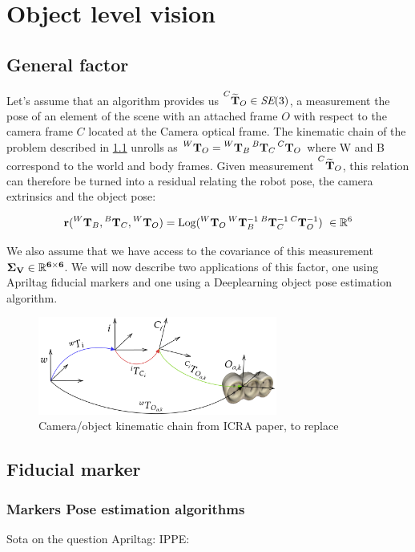 \chapter{Object level vision}
\minitoc


\section{General factor}
Let's assume that an algorithm provides us $\prescript{C}{}{\widetilde{{\bf T}}}_{O} \in \textit{SE}(3)$, a measurement the pose of an element 
of the scene with an attached frame $O$ with respect to the camera frame $C$ located at the Camera optical frame.
The kinematic chain of the problem described in \ref{fig:camera_object_chain} unrolls as 
$\prescript{W}{}{{\bf T}}_{O} = \prescript{W}{}{{\bf T}}_{B}\prescript{B}{}{{\bf T}}_{C}\prescript{C}{}{{\bf T}}_{O}$ where W and B correspond to the world and body frames.
Given measurement $\prescript{C}{}{\widetilde{{\bf T}}}_{O}$, this relation can therefore be turned into a residual relating 
the robot pose, the camera extrinsics and the object pose:

\begin{equation}
    {\bf r} (\prescript{W}{}{{\bf T}}_{B}, \prescript{B}{}{{\bf T}}_{C}, \prescript{W}{}{{\bf T}}_{O}) = \operatorname*{Log}(\prescript{W}{}{{\bf T}}_{O} \prescript{W}{}{{\bf T}}_{B}^{-1} \prescript{B}{}{{\bf T}}_{C}^{-1} \prescript{C}{}{{\bf T}}_{O}^{-1}) ~ \in \mathbb{R}^6
\end{equation}

We also assume that we have access to the covariance of this measurement 
$\bf \Sigma_V \in \mathbb{R}^{6 \times 6}$. We will now describe two applications of this factor, one using Apriltag fiducial markers and one using 
a Deeplearning object pose estimation algorithm.

\begin{figure}
    \centering
    \includegraphics[width=0.7\textwidth]{figures/fig_kinematic_Cesar.png}
    \caption{Camera/object kinematic chain from ICRA paper, to replace }
    \label{fig:camera_object_chain}
\end{figure}

\section{Fiducial marker}
\subsection{Markers Pose estimation algorithms}
Sota on the question
Apriltag: \cite{wang2016iros}
IPPE: \cite{collins2014infinitesimal}

